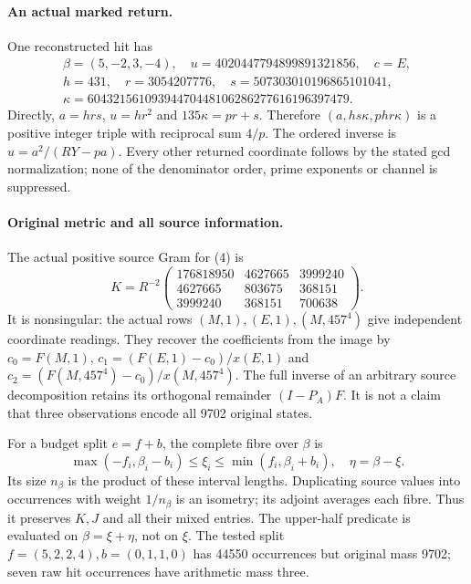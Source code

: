 \documentclass[10pt,a4paper]{article}
\begin{document}
\paragraph{An actual marked return.}
One reconstructed hit has
\[
\begin{gathered}
 \beta=(5,-2,3,-4),\quad u=4020447794899891321856,\quad c=E,\\
 h=431,\quad r=3054207776,\quad s=507303010196865101041,\\
 \kappa=60432156109394470448106286277616196397479.
\end{gathered}
\]
Directly, $a=hrs$, $u=hr^2$ and $135\kappa=pr+s$.
Therefore $(a,hs\kappa,phr\kappa)$ is a positive integer triple with
reciprocal sum $4/p$. The ordered inverse is $u=a^2/(RY-pa)$.
Every other returned coordinate follows by the stated gcd normalization;
none of the denominator order, prime exponents or channel is suppressed.

\newpage
\paragraph{Original metric and all source information.}
The actual positive source Gram for (4) is
\[
 K=R^{-2}\begin{pmatrix}
176818950&4627665&3999240\\
4627665&803675&368151\\
3999240&368151&700638
\end{pmatrix}.
\]
It is nonsingular: the actual rows $(M,1),(E,1),(M,457^4)$ give independent
coordinate readings. They recover the coefficients from the image by
$c_0=F(M,1)$, $c_1=(F(E,1)-c_0)/x(E,1)$ and
$c_2=(F(M,457^4)-c_0)/x(M,457^4)$.
The full inverse of an arbitrary source decomposition retains its orthogonal
remainder $(I-P_A)F$. It is not a claim that three observations encode all
9702 original states.

For a budget split $e=f+b$, the complete fibre over $\beta$ is
\[
 \max(-f_i,\beta_i-b_i)\le\xi_i\le\min(f_i,\beta_i+b_i),\quad
 \eta=\beta-\xi.
\]
Its size $n_\beta$ is the product of these interval lengths. Duplicating source
values into occurrences with weight $1/n_\beta$ is an isometry; its adjoint
averages each fibre. Thus it preserves $K,J$ and all their mixed entries.
The upper-half predicate is evaluated on $\beta=\xi+\eta$, not on $\xi$.
The tested split $f=(5,2,2,4),b=(0,1,1,0)$ has 44550 occurrences but original
mass 9702; seven raw hit occurrences have arithmetic mass three.
\end{document}
